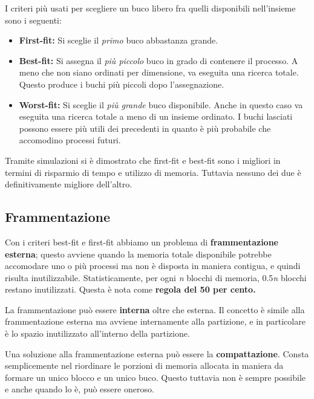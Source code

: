         I criteri più usati per scegliere un buco libero fra quelli disponibili nell'insieme sono i seguenti:
        \begin{itemize}
            \item \textbf{First-fit:} Si sceglie il \textit{primo} buco abbastanza grande.
            
            \item \textbf{Best-fit:} Si assegna il \textit{più piccolo} buco in grado di contenere il processo. A meno che non siano ordinati per dimensione, va eseguita una ricerca totale. Questo produce i buchi più piccoli dopo l'assegnazione.
            
            \item \textbf{Worst-fit:} Si sceglie il \textit{più grande} buco disponibile. Anche in questo caso va eseguita una ricerca totale a meno di un insieme ordinato. I buchi lasciati possono essere più utili dei precedenti in quanto è più probabile che accomodino processi futuri.
        \end{itemize}
        
        Tramite simulazioni si è dimostrato che first-fit e best-fit sono i migliori in termini di risparmio di tempo e utilizzo di memoria. Tuttavia nessuno dei due è definitivamente migliore dell'altro.
        
    \subsection{Frammentazione}
        Con i criteri best-fit e first-fit abbiamo un problema di \textbf{frammentazione esterna}; questo avviene quando la memoria totale disponibile potrebbe accomodare uno o più processi ma non è disposta in maniera contigua, e quindi risulta inutilizzabile. Statisticamente, per ogni \textit{n} blocchi di memoria, 0.5\textit{n} blocchi restano inutilizzati. Questa è nota come \textbf{regola del 50 per cento.}
        
        La frammentazione può essere \textbf{interna} oltre che esterna. Il concetto è simile alla frammentazione esterna ma avviene internamente alla partizione, e in particolare è lo spazio inutilizzato all'interno della partizione.
        
        Una soluzione alla frammentazione esterna può essere la \textbf{compattazione}. Consta semplicemente nel riordinare le porzioni di memoria allocata in maniera da formare un unico blocco e un unico buco. Questo tuttavia non è sempre possibile e anche quando lo è, può essere oneroso.
        
